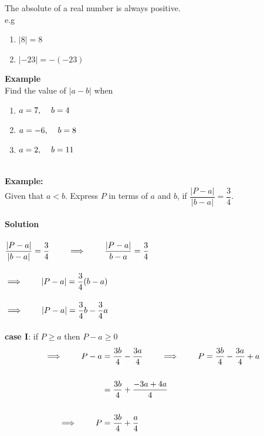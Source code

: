 \documentclass[11pt,a4paper]{article}
\begin{document}
\begin{enumerate}
The absolute of a real number is always positive.\\
e.g
\begin{enumerate}
\item[(a).] $|8|=8$
\item[(b).] $|-23|=-(-23)$\\
\end{enumerate}
\end{enumerate}


\textbf{Example}\\
Find the value of $|a-b|$ when
\begin{enumerate}
\item[(i).] $a=7,\hspace{0.4cm} b=4$
\item[(ii).] $a=-6,\hspace{0.4cm} b=8$
\item[(iii).] $a=2,\hspace{0.4cm} b=11$\\\\
\end{enumerate}



\textbf{Example:}\\
Given that $a<b$. Express $P$ in terms of $a$ and $b$, if $\dfrac{|P-a|}{|b-a|}=\dfrac{3}{4}$.\\\\

\textbf{Solution}\\\\
$\dfrac{|P-a|}{|b-a|}=\dfrac{3}{4}\hspace{0.7cm} \implies \hspace{0.7cm} \dfrac{|P-a|}{b-a}=\dfrac{3}{4}$\\\\

$\implies \hspace{0.7cm} |P-a|=\dfrac{3}{4}(b-a)$\\\\

$\implies \hspace{0.7cm} |P-a|=\dfrac{3}{4}b-\dfrac{3}{4}a$\\\\

\textbf{case I}: if $P\geq a$ then $P-a\geq 0$
\begin{align*}
\implies \hspace{0.7cm} P-a & = \frac{3b}{4}-\frac{3a}{4}\hspace{0.7cm} \implies \hspace{0.7cm}
                        P  = \frac{3b}{4}-\frac{3a}{4}+a\\\\
                          & = \frac{3b}{4}+\frac{-3a+4a}{4}\\\\
\implies \hspace{0.7cm} P & = \frac{3b}{4}+\frac{a}{4}\\\\
\end{align*}
\end{document}
